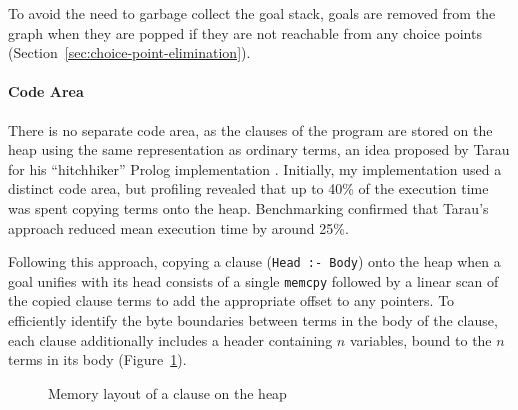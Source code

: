 To avoid the need to garbage collect the goal stack, goals are removed from the graph when they are popped if they are not reachable from any choice points (Section~\ref{sec:choice-point-elimination}).

\paragraph{Code Area} There is no separate code area, as the clauses of the program are stored on the heap using the same representation as ordinary terms, an idea proposed by Tarau for his ``hitchhiker'' Prolog implementation \cite{tarauHitchhikersGuideReinventing2018}. Initially, my implementation used a distinct code area, but profiling revealed that up to 40\% of the execution time was spent copying terms onto the heap. Benchmarking confirmed that Tarau's approach reduced mean execution time by around 25\%.

Following this approach, copying a clause (\texttt{Head :- Body}) onto the heap when a goal unifies with its head consists of a single \texttt{memcpy} followed by a linear scan of the copied clause terms to add the appropriate offset to any pointers. To efficiently identify the byte boundaries between terms in the body of the clause, each clause additionally includes a header containing $n$ variables, bound to the $n$ terms in its body (Figure~\ref{fig:clause-layout}).

\begin{figure}[H]
\centering
{}
\caption{Memory layout of a clause on the heap}
\label{fig:clause-layout}
\end{figure}

